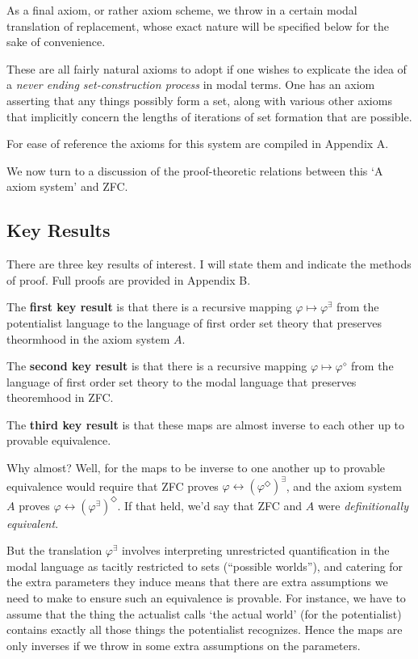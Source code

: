 \documentclass{article}
\begin{document}
As a final axiom, or rather axiom scheme, we throw in a certain modal translation of replacement,
whose exact nature will be specified below for the sake of convenience.

These are all fairly natural axioms to adopt if one wishes to explicate the idea 
of a \emph{never ending set-construction process} in modal terms. One has an axiom 
asserting that any things possibly form a set, along with various other axioms 
that implicitly concern the lengths of iterations of set formation that are possible.

For ease of reference the axioms 
for this system are compiled in Appendix A. 

We now turn to a discussion of the proof-theoretic relations between this `A axiom system'
and ZFC.
\subsection{Key Results}
There are three key results of interest. I will state them and indicate the methods of proof. 
Full proofs are provided in Appendix B. 

The {\bf first key result} is that there is a recursive mapping 
$\varphi \mapsto \varphi^\exists$ from the potentialist 
language to the language of first order set theory that preserves theormhood in the axiom system $A$.

The {\bf second key result} is that there is a recursive mapping 
$\varphi \mapsto \varphi^\diamond$ from the language of first 
order set theory to the modal language that preserves theoremhood in ZFC.

The {\bf third key result} is that these maps are almost inverse to each other up to provable equivalence. 

Why almost? Well, for the maps to be inverse to one another up to provable equivalence would require 
that ZFC proves $\varphi \leftrightarrow (\varphi^\Diamond)^\exists$, and the axiom system $A$ proves 
$\varphi \leftrightarrow (\varphi^\exists)^\Diamond$. If that held, we'd say that ZFC and $A$ were 
\emph{definitionally equivalent}. 

But the translation $\varphi^\exists$ 
involves interpreting unrestricted quantification in the modal language as tacitly restricted 
to sets (``possible worlds''), and catering for the extra parameters they induce means that there
are extra assumptions we need to make to ensure such an equivalence is provable. For 
instance, we have to assume that the thing the actualist calls `the actual world' (for the potentialist)
contains exactly all those things the potentialist recognizes. Hence the maps 
are only inverses if we throw in some extra assumptions on the parameters. 
\end{document}
